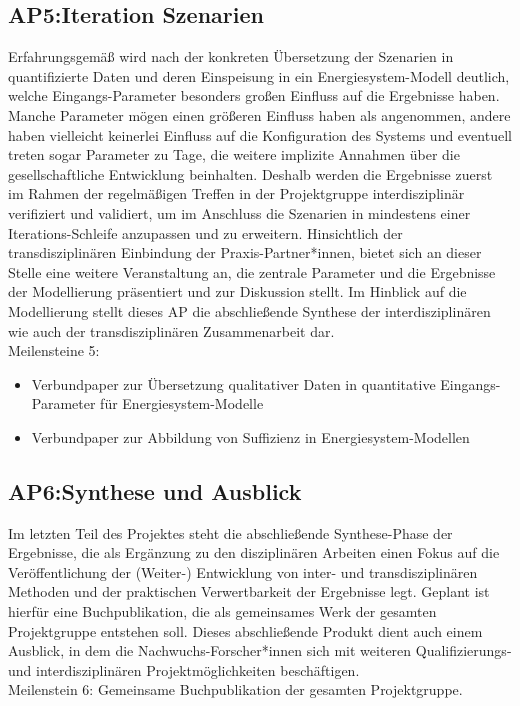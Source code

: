 \documentclass[a4paper,11pt,twoside]{scrartcl}
\begin{document}
\subsection*{AP5:Iteration Szenarien}
Erfahrungsgemäß wird nach der konkreten Übersetzung der Szenarien in quantifizierte Daten und deren Einspeisung in ein Energiesystem-Modell deutlich, welche Eingangs-Parameter besonders großen Einfluss auf die Ergebnisse haben. Manche Parameter mögen einen größeren Einfluss haben als angenommen, andere haben vielleicht keinerlei Einfluss auf die Konfiguration des Systems und eventuell treten sogar Parameter zu Tage, die weitere implizite Annahmen über die gesellschaftliche Entwicklung beinhalten. Deshalb werden die Ergebnisse zuerst im Rahmen der regelmäßigen Treffen in der Projektgruppe interdisziplinär verifiziert und validiert, um im Anschluss die Szenarien in mindestens einer Iterations-Schleife anzupassen und zu erweitern. Hinsichtlich der transdisziplinären Einbindung der Praxis-Partner*innen, bietet sich an dieser Stelle eine weitere Veranstaltung an, die zentrale Parameter und die Ergebnisse der Modellierung präsentiert und zur Diskussion stellt.
Im Hinblick auf die Modellierung stellt dieses AP die abschließende Synthese der interdisziplinären wie auch der transdisziplinären Zusammenarbeit dar.\\ 
Meilensteine 5:
\begin{itemize}
 \item Verbundpaper zur Übersetzung qualitativer Daten in quantitative Eingangs-Parameter für Energiesystem-Modelle
 \item Verbundpaper zur Abbildung von Suffizienz in Energiesystem-Modellen
\end{itemize}

\subsection*{AP6:Synthese und Ausblick}
Im letzten Teil des Projektes steht die abschließende Synthese-Phase der Ergebnisse, die als Ergänzung zu den disziplinären Arbeiten einen Fokus auf die Veröffentlichung der (Weiter-) Entwicklung von inter- und transdisziplinären Methoden und der praktischen Verwertbarkeit der Ergebnisse legt. Geplant ist hierfür eine Buchpublikation, die als gemeinsames Werk der gesamten Projektgruppe entstehen soll. Dieses abschließende Produkt dient auch einem Ausblick, in dem die Nachwuchs-Forscher*innen sich mit weiteren Qualifizierungs- und interdisziplinären Projektmöglichkeiten beschäftigen.\\
Meilenstein 6: Gemeinsame Buchpublikation der gesamten Projektgruppe.
\end{document}
